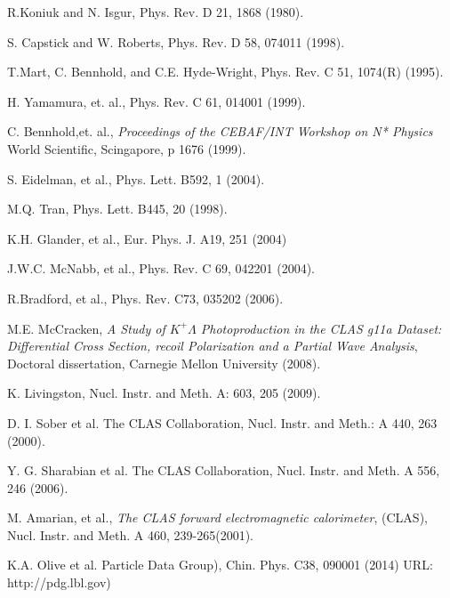 \documentclass[prb,10pt,twocolumn,tightenlines,superscriptaddress]{revtex4-1}
\begin{document}
\begin{thebibliography}{5}
        R.Koniuk and N. Isgur,
        Phys. Rev. D 21, 1868 (1980).
        
        S. Capstick and W. Roberts,
        Phys. Rev. D 58, 074011 (1998).
        
		T.Mart, C. Bennhold, and C.E. Hyde-Wright,
		Phys. Rev. C 51, 1074(R) (1995).

		H. Yamamura, et. al.,
		Phys. Rev. C 61, 014001 (1999).

		C. Bennhold,et. al.,
		{\em Proceedings of the CEBAF/INT Workshop on N* Physics}		
		World Scientific, Scingapore, p 1676 (1999).		

		S. Eidelman, et al., 
		Phys. Lett. B592, 1 (2004).

		M.Q. Tran,
		Phys. Lett. B445, 20 (1998).

		K.H. Glander, et al., 
		Eur. Phys. J. A19, 251 (2004)

		J.W.C. McNabb, et al., 
		Phys. Rev. C 69, 042201 (2004).

		R.Bradford, et al., 
		Phys. Rev. C73, 035202 (2006).
		
        M.E. McCracken,
        {\em A Study of $K^{+}\Lambda$ Photoproduction in the CLAS g11a Dataset: Differential Cross Section, recoil Polarization and a Partial Wave Analysis},
        Doctoral dissertation, Carnegie Mellon University (2008).

        K. Livingston,
        Nucl. Instr. and Meth.
        A: 603, 205 (2009). 

        D. I. Sober et al.
        The CLAS Collaboration,
        Nucl. Instr. and Meth.:
        A 440, 263 (2000). 

        Y. G. Sharabian et al.
        The CLAS Collaboration,
        Nucl. Instr. and Meth.
        A 556, 246 (2006). 

        M. Amarian, et al.,
        {\em The CLAS forward electromagnetic calorimeter}, (CLAS),
        Nucl. Instr. and Meth.
        A 460, 239-265(2001).

        K.A. Olive et al. 
        Particle Data Group), Chin. Phys. C38, 090001 (2014) 	 
        URL: http://pdg.lbl.gov)


\end{thebibliography}
\end{document}

